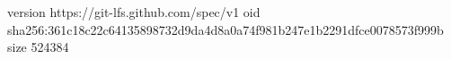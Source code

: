 version https://git-lfs.github.com/spec/v1
oid sha256:361c18c22c64135898732d9da4d8a0a74f981b247e1b2291dfce0078573f999b
size 524384
